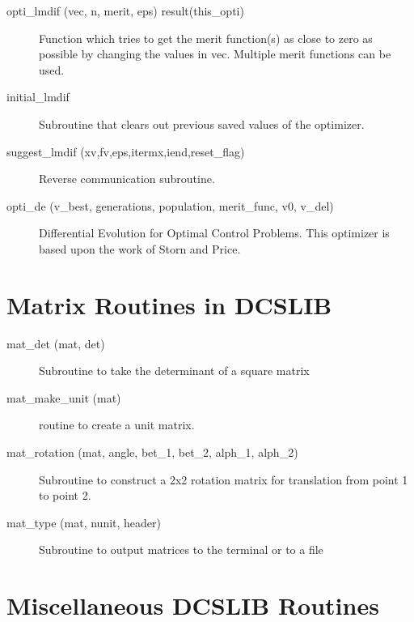 \begin{description}

\item[opti\_lmdif (vec, n, merit, eps) result(this\_opti)] \Newline 
     Function which tries to get the merit function(s) as close to zero as possible
     by changing the values in vec. Multiple merit functions can be used.

\item[initial\_lmdif] \Newline 
     Subroutine that clears out previous saved values of the optimizer.

\item[suggest\_lmdif (xv,fv,eps,itermx,iend,reset\_flag)] \Newline 
     Reverse communication subroutine. 

\item[opti\_de (v\_best, generations, population, merit\_func, v0, v\_del)] \Newline 
     Differential Evolution for Optimal Control Problems.
     This optimizer is based upon the work of Storn and Price. 

\end{description}

\section{Matrix Routines in DCSLIB}
\label{r:dcs_matrix}      

\begin{description}

\item[mat\_det (mat, det)] \Newline 
     Subroutine to take the determinant of a square matrix

\item[mat\_make\_unit (mat)] \Newline 
     routine to create a unit matrix.

\item[mat\_rotation (mat, angle, bet\_1, bet\_2, alph\_1, alph\_2)] \Newline 
     Subroutine to construct a 2x2 rotation matrix for translation from
     point 1 to point 2.

\item[mat\_type (mat, nunit, header)] \Newline 
     Subroutine to output matrices to the terminal or to a file

\end{description}

\section{Miscellaneous DCSLIB Routines}
\label{r:dcs_misc}      

